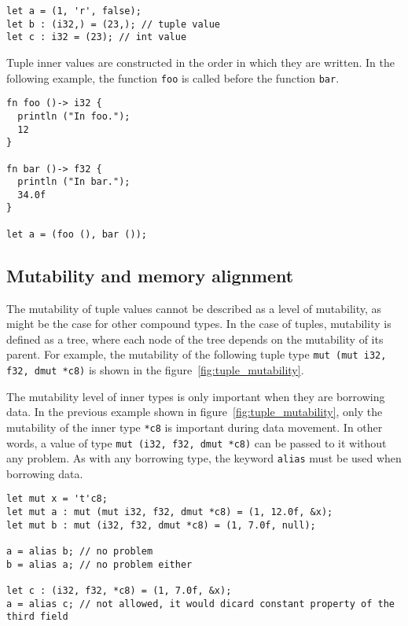 \begin{lstlisting}[style=coloredverbatim]
let a = (1, 'r', false);
let b : (i32,) = (23,); // tuple value
let c : i32 = (23); // int value
\end{lstlisting}

\noindent Tuple inner values are constructed in the order in which they are
written. In the following example, the function \texttt{foo} is called before
the function \texttt{bar}.

\begin{lstlisting}[style=coloredverbatim]
fn foo ()-> i32 {
  println ("In foo.");
  12
}

fn bar ()-> f32 {
  println ("In bar.");
  34.0f
}

let a = (foo (), bar ());
\end{lstlisting}

\subsection {Mutability and memory alignment}%
\label{sec:tuple_mutability}

The mutability of tuple values cannot be described as a level of mutability, as
might be the case for other compound types. In the case of tuples, mutability is
defined as a tree, where each node of the tree depends on the mutability of its
parent. For example, the mutability of the following tuple type \texttt{mut (mut
  i32, f32, dmut *c8)} is shown in the figure~\ref{fig:tuple_mutability}.



The mutability level of inner types is only important when they are borrowing
data. In the previous example shown in figure~\ref{fig:tuple_mutability}, only
the mutability of the inner type \texttt{*c8} is important during data movement.
In other words, a value of type \texttt{mut (i32, f32, dmut *c8)} can be passed
to it without any problem. As with any borrowing type, the keyword
\texttt{alias} must be used when borrowing data.

\begin{lstlisting}[style=coloredverbatim]
let mut x = 't'c8;
let mut a : mut (mut i32, f32, dmut *c8) = (1, 12.0f, &x);
let mut b : mut (i32, f32, dmut *c8) = (1, 7.0f, null);

a = alias b; // no problem
b = alias a; // no problem either

let c : (i32, f32, *c8) = (1, 7.0f, &x);
a = alias c; // not allowed, it would dicard constant property of the third field
\end{lstlisting}

